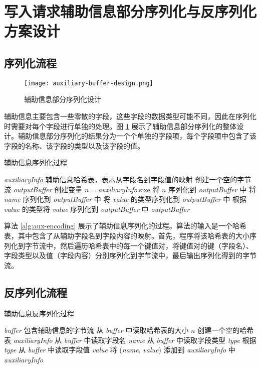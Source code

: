 \section{写入请求辅助信息部分序列化与反序列化方案设计}
\subsection{序列化流程}
\begin{figure}
  \centering
  \texttt{[image: auxiliary-buffer-design.png]}
  \caption{辅助信息部分序列化设计}
  \label{fig:aux-encoding-general}
\end{figure}

辅助信息主要包含一些零散的字段，这些字段的数据类型可能不同，因此在序列化时需要对每个字段进行单独的处理。图 \ref{fig:aux-encoding-general} 展示了辅助信息部分序列化的整体设计。辅助信息部分序列化的结果分为一个个单独的字段项，每个字段项中包含了该字段的名称、该字段的类型以及该字段的值。

\begin{algorithm}
  \caption{辅助信息序列化过程}
  \label{alg:aux-encoding}
  \small
  \begin{algorithmic}
    \REQUIRE \emph{auxiliaryInfo} 辅助信息哈希表，表示从字段名到字段值的映射
    \STATE 创建一个空的字节流 \emph{outputBuffer}
    \STATE 创建变量 $n = $\emph{auxiliaryInfo}.size
    \STATE 将 $n$ 序列化到 \emph{outputBuffer} 中
      \STATE 将 \emph{name} 序列化到 \emph{outputBuffer} 中
      \STATE 将 \emph{value} 的类型序列化到 \emph{outputBuffer} 中
      \STATE 根据 \emph{value} 的类型将 \emph{value} 序列化到 \emph{outputBuffer} 中
    \ENDFOR
    \RETURN \emph{outputBuffer}
  \end{algorithmic}
\end{algorithm}

算法 \ref{alg:aux-encoding} 展示了辅助信息序列化的过程。算法的输入是一个哈希表，其中包含了从辅助字段名到字段内容的映射。首先，程序将该哈希表的大小序列化到字节流中，然后遍历哈希表中的每一个键值对，将键值对的键（字段名）、字段类型以及值（字段内容）分别序列化到字节流中，最后输出序列化得到的字节流。

\subsection{反序列化流程}
\begin{algorithm}
  \caption{辅助信息反序列化过程}
  \label{alg:aux-decoding}
  \small
  \begin{algorithmic}
    \REQUIRE \emph{buffer} 包含辅助信息的字节流
    \STATE 从 \emph{buffer} 中读取哈希表的大小 $n$
    \STATE 创建一个空的哈希表 \emph{auxiliaryInfo}
      \STATE 从 \emph{buffer} 中读取字段名 \emph{name}
      \STATE 从 \emph{buffer} 中读取字段类型 \emph{type}
      \STATE 根据 \emph{type} 从 \emph{buffer} 中读取字段值 \emph{value}
      \STATE 将 (\emph{name}, \emph{value}) 添加到 \emph{auxiliaryInfo} 中
    \ENDFOR
    \RETURN \emph{auxiliaryInfo}
  \end{algorithmic}
\end{algorithm}

